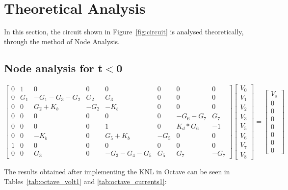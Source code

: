 \section{Theoretical Analysis}
\label{sec:analysis}

\tab In this section, the circuit shown in Figure~\ref{fig:circuit} is analysed
theoretically, through the method of Node Analysis.

\subsection{Node analysis for t$<$0}
\label{subsec:node}
\tab 
\begin{equation}
\begin{bmatrix}
  0 & 1 & 0 & 0 & 0 & 0 & 0 & 0 \\
  0 & G_1 & -G_1-G_3-G_2 & G_2 & G_3 & 0 & 0 & 0 \\
  0 & 0 & G_2+K_b & -G_2 & -K_b & 0 & 0 & 0 \\
  0 & 0 & 0 & 0 & 0 & 0 & -G_6-G_7 & G_7 \\
  0 & 0 & 0 & 0 & 1 & 0 & K_d*G_6 & -1 \\
  0 & 0 & -K_b & 0 & G_5+K_b & -G_5 & 0 & 0 \\
  1 & 0 & 0 & 0 & 0 & 0 & 0 & 0 \\
  0 & 0 & G_3 & 0 & -G_3-G_4-G_5 & G_5 & G_7 & -G_7
\end{bmatrix}
\begin{bmatrix}
  V_0 \\ V_1 \\ V_2 \\ V_3 \\ V_5 \\ V_6 \\ V_7 \\ V_8
\end{bmatrix}
=
\begin{bmatrix}
  V_s \\ 0 \\ 0 \\ 0 \\ 0 \\ 0 \\ 0 \\ 0
\end{bmatrix}
\end{equation}

The results obtained after implementing the KNL in Octave can be seen in Tables~\ref{tab:octave_volt1} and \ref{tab:octave_currents1}:

